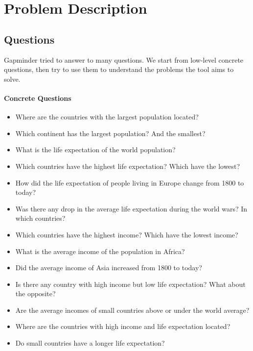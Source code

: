\section{Problem Description}
\label{sec:problem}

\subsection{Questions}
Gapminder tried to answer to many questions.
We start from low-level concrete questions, then try to use them to understand the problems the tool aims to solve. 

\paragraph{Concrete Questions}
\begin{itemize}

    \item Where are the countries with the largest population located?
    \item Which continent has the largest population? And the smallest?

    \item What is the life expectation of the world population?
    \item Which countries have the highest life expectation? Which have the lowest?
    \item How did the life expectation of people living in Europe change from 1800 to today?
    \item Was there any drop in the average life expectation during the world wars? In which countries?

    \item Which countries have the highest income? Which have the lowest income?
    \item What is the average income of the population in Africa?
    \item Did the average income of Asia increased from 1800 to today?  

    \item Is there any country with high income but low life expectation? What about the opposite?
    \item Are the average incomes of small countries above or under the world average?
    \item Where are the countries with high income and life expectation located?
    \item Do small countries have a longer life expectation?

\end{itemize}

